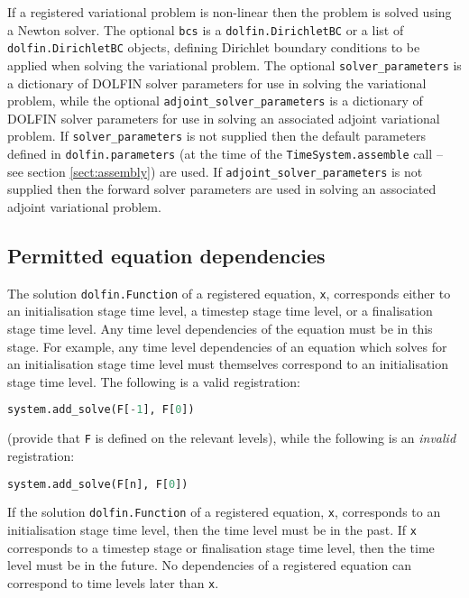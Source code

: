 \documentclass[a4paper]{book}
\begin{document}
If a registered variational problem is non-linear then the problem is solved
using a Newton solver. The optional \verb+bcs+ is a \verb+dolfin.DirichletBC+ or
a list of \verb+dolfin.DirichletBC+ objects, defining Dirichlet boundary
conditions to be applied when solving the variational problem. The optional
\verb+solver_parameters+ is a dictionary of DOLFIN solver parameters for use in
solving the variational problem, while the optional
\verb+adjoint_solver_parameters+ is a dictionary of DOLFIN solver parameters for
use in solving an associated adjoint variational problem. If
\verb+solver_parameters+ is not supplied then the default parameters defined in
\verb+dolfin.parameters+ (at the time of the \verb+TimeSystem.assemble+ call --
see section \ref{sect:assembly}) are used. If \verb+adjoint_solver_parameters+
is not supplied then the forward solver parameters are used in solving an
associated adjoint variational problem.

\subsection{Permitted equation dependencies}

The solution \verb+dolfin.Function+ of a registered equation, \verb+x+,
corresponds either to an initialisation stage time level, a timestep stage time
level, or a finalisation stage time level. Any time level dependencies of the
equation must be in this stage. For example, any time level dependencies of an
equation which solves for an initialisation stage time level must themselves
correspond to an initialisation stage time level. The following is a valid
registration:
\begin{lstlisting}[language = python, frame = single, basicstyle=\footnotesize]
system.add_solve(F[-1], F[0])
\end{lstlisting}
(provide that \verb+F+ is defined on the relevant levels), while the following
is an \emph{invalid} registration:
\begin{lstlisting}[language = python, frame = single, basicstyle=\footnotesize]
system.add_solve(F[n], F[0])
\end{lstlisting}

If the solution \verb+dolfin.Function+ of a registered equation, \verb+x+,
corresponds to an initialisation stage time level, then the time level must be
in the past. If \verb+x+ corresponds to a timestep stage or finalisation stage
time level, then the time level must be in the future. No dependencies of a
registered equation can correspond to time levels later than \verb+x+.
\end{document}
